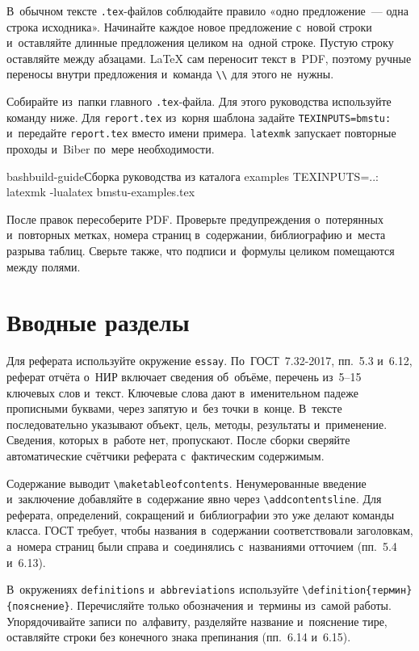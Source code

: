 \documentclass{bmstu}
\begin{document}
В~обычном тексте \texttt{.tex}-файлов соблюдайте правило «одно предложение~--- одна строка исходника».
Начинайте каждое новое предложение с~новой строки и~оставляйте длинные предложения целиком на~одной строке.
Пустую строку оставляйте между абзацами.
LaTeX сам переносит текст в~PDF, поэтому ручные переносы внутри предложения и~команда \verb|\\| для этого не~нужны.

Собирайте из~папки главного \texttt{.tex}-файла.
Для этого руководства используйте команду ниже.
Для \texttt{report.tex} из~корня шаблона задайте \texttt{TEXINPUTS=bmstu:} и~передайте \texttt{report.tex} вместо имени примера.
\texttt{latexmk} запускает повторные проходы и~Biber по~мере необходимости.

\begin{listing}{bash}{build-guide}{Сборка руководства из каталога examples}
TEXINPUTS=..: latexmk -lualatex bmstu-examples.tex
\end{listing}

После правок пересоберите PDF.
Проверьте предупреждения о~потерянных и~повторных метках, номера страниц в~содержании, библиографию и~места разрыва таблиц.
Сверьте также, что подписи и~формулы целиком помещаются между полями.

\section{Вводные разделы}

Для реферата используйте окружение \texttt{essay}.
По~ГОСТ~7.32-2017, пп.~5.3 и~6.12, реферат отчёта о~НИР включает сведения об~объёме, перечень из~5--15 ключевых слов и~текст.
Ключевые слова дают в~именительном падеже прописными буквами, через запятую и~без точки в~конце.
В~тексте последовательно указывают объект, цель, методы, результаты и~применение.
Сведения, которых в~работе нет, пропускают.
После сборки сверяйте автоматические счётчики реферата с~фактическим содержимым.

Содержание выводит \verb|\maketableofcontents|.
Ненумерованные введение и~заключение добавляйте в~содержание явно через \verb|\addcontentsline|.
Для реферата, определений, сокращений и~библиографии это уже делают команды класса.
ГОСТ требует, чтобы названия в~содержании соответствовали заголовкам, а~номера страниц были справа и~соединялись с~названиями отточием (пп.~5.4 и~6.13).

В~окружениях \texttt{definitions} и~\texttt{abbreviations} используйте \verb|\definition{термин}{пояснение}|.
Перечисляйте только обозначения и~термины из~самой работы.
Упорядочивайте записи по~алфавиту, разделяйте название и~пояснение тире, оставляйте строки без конечного знака препинания (пп.~6.14 и~6.15).
\end{document}
